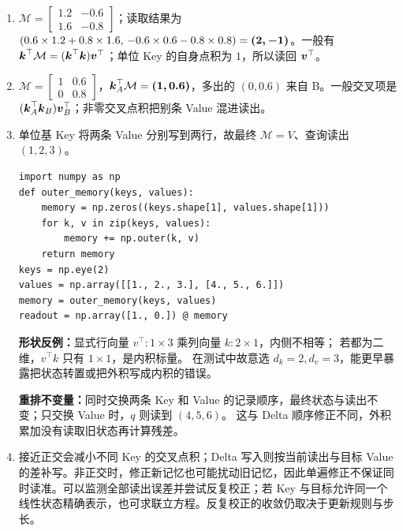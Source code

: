 \begin{enumerate}[label={},leftmargin=4.8em,itemsep=4pt]
\item[\textbf{\hyperref[exercise:memory-single-write]{C-131.}}] \leavevmode{}\label{solution:C-131}\label{solution:memory-single-write}$\mathcal{M}=\begin{bmatrix}1.2&-0.6\\1.6&-0.8\end{bmatrix}$；读取结果为 $(0.6\times1.2+0.8\times1.6,\,-0.6\times0.6-0.8\times0.8)=\boldsymbol{(2,-1)}$。一般有 $\boldsymbol{k}^\top\mathcal{M}=(\boldsymbol{k}^\top\boldsymbol{k})\boldsymbol{v}^\top$；单位 Key 的自身点积为 $1$，所以读回 $\boldsymbol{v}^\top$。
\item[\textbf{\hyperref[exercise:memory-cross-talk]{C-132.}}] \leavevmode{}\label{solution:C-132}\label{solution:memory-cross-talk}$\mathcal{M}=\begin{bmatrix}1&0.6\\0&0.8\end{bmatrix}$，$\boldsymbol{k}_A^\top\mathcal{M}=\boldsymbol{(1,0.6)}$，多出的 $(0,0.6)$ 来自 B。一般交叉项是 $(\boldsymbol{k}_A^\top\boldsymbol{k}_B)\boldsymbol{v}_B^\top$；非零交叉点积把别条 Value 混进读出。
\item[\textbf{\hyperref[exercise:memory-outer-shape]{C-133.}}] \leavevmode{}\label{solution:C-133}\label{solution:memory-outer-shape}单位基 Key 将两条 Value 分别写到两行，故最终 $\mathcal M=V$、查询读出 $(1,2,3)$。\par\nobreak
\begin{samepage}\begin{verbatim}
import numpy as np
def outer_memory(keys, values):
    memory = np.zeros((keys.shape[1], values.shape[1]))
    for k, v in zip(keys, values):
        memory += np.outer(k, v)
    return memory
keys = np.eye(2)
values = np.array([[1., 2., 3.], [4., 5., 6.]])
memory = outer_memory(keys, values)
readout = np.array([1., 0.]) @ memory
\end{verbatim}\end{samepage}
\textbf{形状反例：}显式行向量 $v^\top:1\times3$ 乘列向量 $k:2\times1$，内侧不相等；
若都为二维，$v^\top k$ 只有 $1\times1$，是内积标量。
在测试中故意选 $d_k=2,d_v=3$，能更早暴露把状态转置或把外积写成内积的错误。
\par\textbf{重排不变量：}同时交换两条 Key 和 Value 的记录顺序，最终状态与读出不变；只交换 Value 时，$q$ 则读到 $(4,5,6)$。
这与 Delta 顺序修正不同，外积累加没有读取旧状态再计算残差。
\item[\textbf{\hyperref[exercise:memory-write-strategies]{C-134.}}] \leavevmode{}\label{solution:C-134}\label{solution:memory-write-strategies}接近正交会减小不同 Key 的交叉点积；Delta 写入则按当前读出与目标 Value 的差补写。非正交时，修正新记忆也可能扰动旧记忆，因此单遍修正不保证同时读准。可以监测全部读出误差并尝试反复校正；若 Key 与目标允许同一个线性状态精确表示，也可求联立方程。反复校正的收敛仍取决于更新规则与步长。

\end{enumerate}
